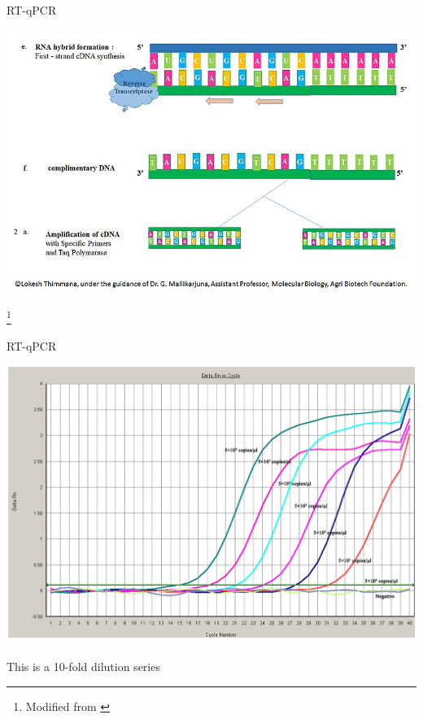 \documentclass[aspectratio=169,11pt]{beamer}
\newcommand\blfootnote[1]{%
  \begingroup
  \renewcommand\thefootnote{}\footnote{#1}%
  \addtocounter{footnote}{-1}%
  \endgroup
}
\begin{document}
\begin{frame}{RT-qPCR}

	\begin{center}
	\includegraphics[scale=0.3]{figures/RTqPCR2.png} 
	\end{center}
	
	\blfootnote{Modified from \cite{By Lokeshthimmana - Own work, CC BY-SA 4.0, https://commons.wikimedia.org/w/index.php?curid=76313637}}	

\end{frame}

\begin{frame}{RT-qPCR}

	\begin{center}
		\includegraphics[scale=0.5]{figures/qPCR.png} 
		~\\
		This is a 10-fold dilution series
	\end{center}

\end{frame}
\end{document}
